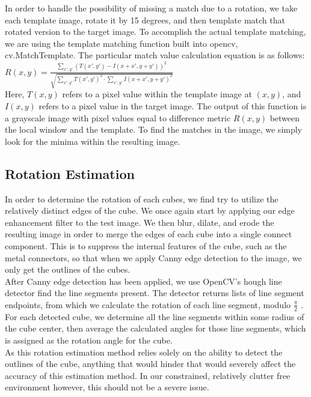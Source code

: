 \documentclass[conference]{IEEEtran}
\begin{document}
In order to handle the possibility of missing a match due to a rotation, we take each template image, rotate it by 15 degrees, and then template match that rotated version to the target image.  To accomplish the actual template matching, we are using the template matching function built into opencv, cv.MatchTemplate. The particular match value calculation equation is as follows: 
\\[6pt]
\begin{math} 
	R(x,y) = \frac{\sum_{x',y'}(T(x',y')-I(x+x',y+y'))^{2}}{\sqrt{\sum_{x',y'}T(x',y')^{2}\cdot \sum_{x',y'}I(x+x',y+y')^{2} }}
\end{math} 
\\[6pt]
Here, $T(x,y)$ refers to a pixel value within the template image at $(x,y)$, and $I(x,y)$ refers to a pixel value in the target image. The output of this function is a grayscale image with pixel values equal to difference metric $R(x,y)$ between the local window and the template.  To find the matches in the image, we simply look for the minima within the resulting image.

\subsection{Rotation Estimation}
In order to determine the rotation of each cubes, we find try to utilize the relatively distinct edges of the cube.  We once again start by applying our edge enhancement filter to the test image.  We then blur, dilate, and erode the resulting image in order to merge the edges of each cube into a single connect component.  This is to suppress the internal features of the cube, such as the metal connectors, so that when we apply Canny edge detection to the image, we only get the outlines of the cubes.  \\

After Canny edge detection has been applied, we use OpenCV's hough line detector find the line segments present.  The detector returns lists of line segment endpoints, from which we calculate the rotation of each line segment, modulo $ \frac{\pi}{2}$ .  For each detected cube, we determine all the line segments within some radius of the cube center, then average the calculated angles for those line segments, which is assigned as the rotation angle for the cube. \\

As this rotation estimation method relies solely on the ability to detect the outlines of the cube, anything that would hinder that would severely affect the accuracy of this estimation method. In our constrained, relatively clutter free environment however, this should not be a severe issue.
\end{document}
